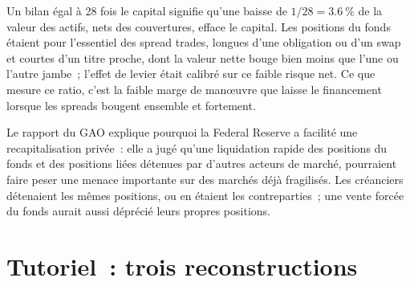 Un bilan égal à 28 fois le capital signifie qu'une baisse de $1/28=3.6~\%$ de la valeur des actifs, nets des couvertures, efface le capital. Les positions du fonds
étaient pour l'essentiel des spread trades, longues d'une obligation ou d'un swap et courtes d'un titre proche, dont la valeur nette bouge bien moins que l'une ou l'autre jambe~; l'effet de levier
était calibré sur ce faible risque net. Ce que mesure ce ratio, c'est la faible marge de manœuvre que laisse le financement lorsque les spreads bougent ensemble et fortement.

Le rapport du GAO explique pourquoi la Federal Reserve a facilité une recapitalisation privée~: elle a jugé qu'une liquidation rapide des positions du fonds
et des positions liées détenues par d'autres acteurs de marché, pourraient faire peser une menace importante sur des marchés déjà fragilisés. Les
créanciers détenaient les mêmes positions, ou en étaient les contreparties~; une vente forcée du fonds aurait aussi déprécié leurs propres positions.

\section{Tutoriel~: trois reconstructions}\label{tut:fm:case-studies-i:tut}

